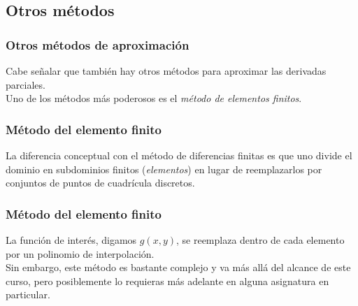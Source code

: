 \subsection*{Otros métodos}
\begin{frame}
\frametitle{Otros métodos de aproximación}
Cabe señalar que también hay otros métodos para aproximar las derivadas parciales.
\\
\bigskip
Uno de los métodos más poderosos es el \emph{método de elementos finitos}.
\end{frame}
\begin{frame}
\frametitle{Método del elemento finito}
La diferencia conceptual con el método de diferencias finitas es que uno divide el dominio en subdominios finitos (\emph{elementos}) en lugar de reemplazarlos por conjuntos de puntos de cuadrícula discretos.
\end{frame}
\begin{frame}
\frametitle{Método del elemento finito}
La función de interés, digamos $g(x, y)$, se reemplaza dentro de cada elemento por un polinomio de interpolación.
\\
\bigskip
Sin embargo, este método es bastante complejo y va más allá del alcance de este curso, pero posiblemente lo requieras más adelante en alguna asignatura en particular.
\end{frame}

